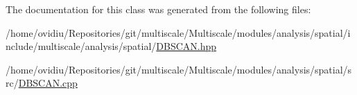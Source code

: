 The documentation for this class was generated from the following files\-:\begin{DoxyCompactItemize}
\item 
/home/ovidiu/\-Repositories/git/multiscale/\-Multiscale/modules/analysis/spatial/include/multiscale/analysis/spatial/\hyperlink{DBSCAN_8hpp}{D\-B\-S\-C\-A\-N.\-hpp}\item 
/home/ovidiu/\-Repositories/git/multiscale/\-Multiscale/modules/analysis/spatial/src/\hyperlink{DBSCAN_8cpp}{D\-B\-S\-C\-A\-N.\-cpp}\end{DoxyCompactItemize}

